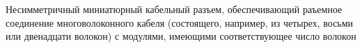 Несимметричный миниатюрный кабельный разъем,
обеспечивающий раъемное соединение многоволоконного
кабеля (состоящего, например, из четырех, восьми или двенадцати
волокон) с модулями, имеющими
соответствующее число волокон